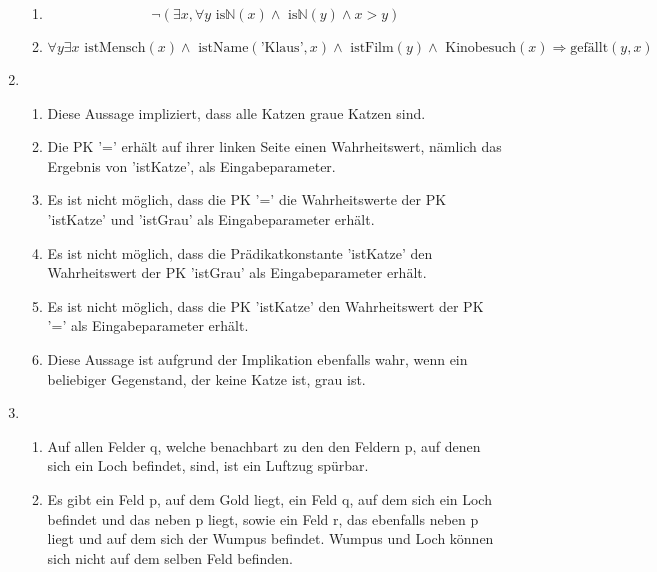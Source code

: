 \documentclass[a4paper]{article}
\begin{document}
\begin{enumerate}
\begin{enumerate}
			\item
			\begin{equation*}
				\lnot (\exists x, \forall y \text{ is}\mathbb{N}(x) \land \text{ is}\mathbb{N}(y) \land x > y)
			\end{equation*}
			
			\item
			\begin{equation*}
				\forall y \exists x \text{ istMensch}(x) \land \text{ istName}(\text{'Klaus'}, x) \land \text{ istFilm}(y) \land \text{ Kinobesuch}(x) \Rightarrow \text{gefällt}(y, x)
			\end{equation*}
		\end{enumerate}
		
		\item
		\begin{enumerate}
			\item
			Diese Aussage impliziert, dass alle Katzen graue Katzen sind.
			
			\item
			Die PK '=' erhält auf ihrer linken Seite einen Wahrheitswert, nämlich das Ergebnis von 'istKatze', als Eingabeparameter.
			
			\item
			Es ist nicht möglich, dass die PK '=' die Wahrheitswerte der PK 'istKatze' und 'istGrau' als Eingabeparameter erhält.
			
			\item
			Es ist nicht möglich, dass die Prädikatkonstante 'istKatze' den Wahrheitswert der PK 'istGrau' als Eingabeparameter erhält.
			
			\item
			Es ist nicht möglich, dass die PK 'istKatze' den Wahrheitswert der PK '=' als Eingabeparameter erhält.
			
			\item
			Diese Aussage ist aufgrund der Implikation ebenfalls wahr, wenn ein beliebiger Gegenstand, der keine Katze ist, grau ist.
		\end{enumerate}
		
		\item
		\begin{enumerate}
			\item
			Auf allen Felder q, welche benachbart zu den den Feldern p, auf denen sich ein Loch befindet, sind, ist ein Luftzug spürbar.
			
			\item
			Es gibt ein Feld p, auf dem Gold liegt, ein Feld q, auf dem sich ein Loch befindet und das neben p liegt, sowie ein Feld r, das ebenfalls neben p liegt und auf dem sich der Wumpus befindet. Wumpus und Loch können sich nicht auf dem selben Feld befinden.
			

\end{enumerate}
\end{enumerate}
\end{document}
